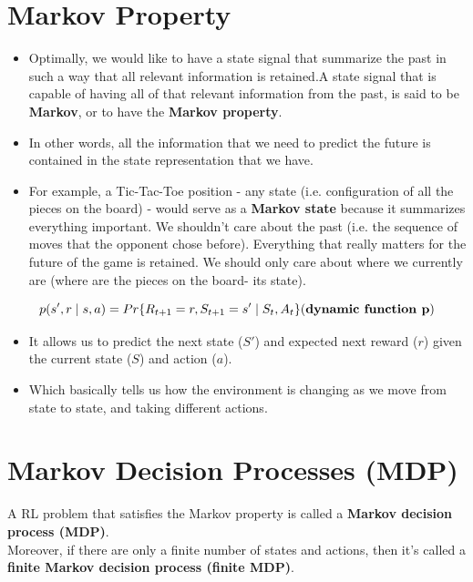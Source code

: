 \section{Markov Property \cite{medium-introduction-to-reinforcement-learning-rl-part-3-finite-markov-decision-processes-51e1f8d3ddb7}}\label{RL: Markov Property}
\begin{itemize}
    \item Optimally, we would like to have a state signal that summarize the past in such a way that all relevant information is retained.A state signal that is capable of having all of that relevant information from the past, is said to be \textbf{Markov}, or to have the \textbf{Markov property}.
    \item In other words, all the information that we need to predict the future is contained in the state representation that we have.
    \item For example, a Tic-Tac-Toe position - any state (i.e. configuration of all the pieces on the board) - would serve as a \textbf{Markov state} because it summarizes everything important. We shouldn’t care about the past (i.e. the sequence of moves that the opponent chose before). Everything that really matters for the future of the game is retained. We should only care about where we currently are (where are the pieces on the board- its state).
\end{itemize}

\[
    p(s',r \mid s,a) = Pr\{R_{t+1} = r, S_{t+1}=s' \mid S_t,A_t\} \hfill (\text{\textbf{dynamic function p}})
\]

\begin{itemize}
    \item It allows us to predict the next state ($S'$) and expected next reward ($r$) given the current state ($S$) and action ($a$).
    \item Which basically tells us how the environment is changing as we move from state to state, and taking different actions.
\end{itemize}


\section{Markov Decision Processes (MDP) \cite{medium-introduction-to-reinforcement-learning-rl-part-3-finite-markov-decision-processes-51e1f8d3ddb7}}\label{RL: Markov Decision Processes (MDP)}
A RL problem that satisfies the Markov property is called a \textbf{Markov decision process (MDP)}.\\
Moreover, if there are only a finite number of states and actions, then it’s called a \textbf{finite Markov decision process (finite MDP)}.

